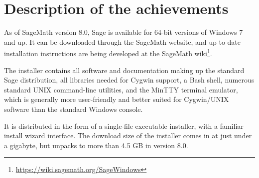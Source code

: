 \section{Description of the achievements}

As of SageMath version 8.0, Sage is available for 64-bit versions of
Windows 7 and up. It can be downloaded through the SageMath website, and
up-to-date installation instructions are being developed at the SageMath
wiki\footnote{\url{https://wiki.sagemath.org/SageWindows}}.

The installer contains all software and documentation making up the standard
Sage distribution, all libraries needed for Cygwin support, a Bash shell,
numerous standard UNIX command-line utilities, and the MinTTY terminal
emulator, which is generally more user-friendly and better suited for
Cygwin/UNIX software than the standard Windows console.

It is distributed in the form of a single-file executable installer, with a
familiar install wizard interface. The download size of the installer comes in
at just under a gigabyte, but unpacks to more than 4.5 GB in version 8.0.

